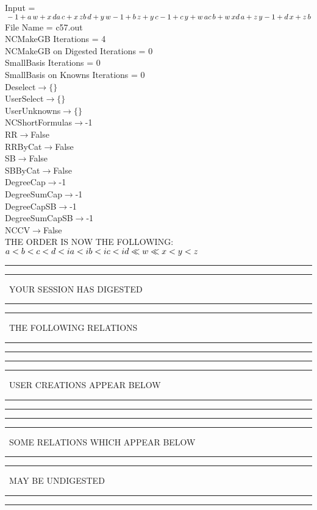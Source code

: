 \documentclass[rep10,leqno]{report}
\begin{document}
\normalsize
\baselineskip=12pt
\noindent
Input = 
$
\\-1 + a\,
 w + x\,
 d\\
a\,
 c + x\,
 z\\
b\,
 d + y\,
 w\\
-1 + b\,
 z + y\,
 c\\
-1 + c\,
 y + w\,
 a\\
c\,
 b + w\,
 x\\
d\,
 a + z\,
 y\\
-1 + d\,
 x + z\,
 b\\
$
File Name = c57.out\\
NCMakeGB Iterations = 4\\
NCMakeGB on Digested Iterations = 0\\
SmallBasis Iterations = 0\\
SmallBasis on Knowns Iterations = 0\\
Deselect$\rightarrow \{\}$\\
UserSelect$\rightarrow \{\}$\\
UserUnknowns$\rightarrow \{\}$\\
NCShortFormulas$\rightarrow$-1\\
RR$\rightarrow $False\\
RRByCat$\rightarrow $False\\
SB$\rightarrow $False\\
SBByCat$\rightarrow $False\\
DegreeCap$\rightarrow $-1\\
DegreeSumCap$\rightarrow $-1\\
DegreeCapSB$\rightarrow $-1\\
DegreeSumCapSB$\rightarrow $-1\\
NCCV$\rightarrow $False\\
THE ORDER IS NOW THE FOLLOWING:\hfil\break
$
a<b<c<d<ia<ib<ic<id\ll
w\ll
x<y<z\\
$
\rule[2pt]{6in}{4pt}\hfil\break
\rule[2pt]{1.879in}{4pt}
\ YOUR SESSION HAS DIGESTED\ 
\rule[2pt]{1.879in}{4pt}\hfil\break
\rule[2pt]{1.923in}{4pt}
\ THE FOLLOWING RELATIONS\ 
\rule[2pt]{1.923in}{4pt}\hfil\break
\rule[2pt]{6in}{4pt}\hfil\break
\rule[2pt]{6in}{1pt}\hfil\break
\rule[2.5pt]{1.701in}{1pt}
\ USER CREATIONS APPEAR BELOW\ 
\rule[2.5pt]{1.701in}{1pt}\hfil\break
\rule[2pt]{6in}{1pt}\hfil\break
\rule[2pt]{6in}{4pt}\hfil\break
\rule[2pt]{1.45in}{4pt}
\ SOME RELATIONS WHICH APPEAR BELOW\ 
\rule[2pt]{1.45in}{4pt}\hfil\break
\rule[2pt]{2.18in}{4pt}
\ MAY BE UNDIGESTED\ 
\rule[2pt]{2.18in}{4pt}\hfil\break
\rule[2pt]{6in}{4pt}\hfil\break
\end{document}
